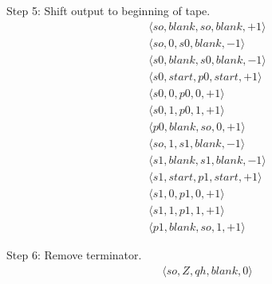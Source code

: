 \documentclass[12pt]{extarticle}
\begin{document}
Step 5: Shift output to beginning of tape.
\begin{align*}
\langle so, blank, so, blank, +1 \rangle \\
\langle so, 0, s0, blank, -1 \rangle \\
\langle s0, blank, s0, blank, -1 \rangle \\
\langle s0, start, p0, start, +1 \rangle \\
\langle s0, 0, p0, 0, +1 \rangle \\
\langle s0, 1, p0, 1, +1 \rangle \\
\langle p0, blank, so, 0, +1 \rangle \\
\langle so, 1, s1, blank, -1 \rangle \\
\langle s1, blank, s1, blank, -1 \rangle \\
\langle s1, start, p1, start, +1 \rangle \\
\langle s1, 0, p1, 0, +1 \rangle \\
\langle s1, 1, p1, 1, +1 \rangle \\
\langle p1, blank, so, 1, +1 \rangle
\end{align*}

Step 6: Remove terminator.
\begin{align*}
\langle so, Z, qh, blank, 0 \rangle
\end{align*}
\end{document}
